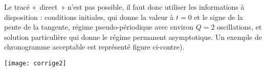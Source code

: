 \documentclass[../TDE4-E5.tex]{subfiles}%
\begin{document}
{	\noindent
	\begin{minipage}[c]{.48\linewidth}
		Le tracé «~direct~» n'est pas possible, il faut donc utiliser les
		informations à disposition : conditions initiales, qui donne la valeur à $t
			= 0$ et le signe de la pente de la tangente, régime pseudo-périodique avec
		environ $Q = 2$ oscillations, et solution particulière qui donne le régime
		permanent asymptotique. Un exemple de chronogramme acceptable est représenté
		figure ci-contre).
	\end{minipage}
	\begin{minipage}[c]{.48\linewidth}
		\begin{center}
			\texttt{[image: corrige2]}
		\end{center}
	\end{minipage}
}%
\end{document}
